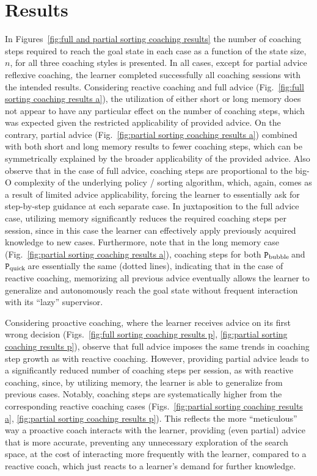 \documentclass[a4paper,twoside]{article}
\newcommand{\bubblecoach}{\ensuremath{\texttt{P}_{\rm bubble}}\,}
\newcommand{\quickcoach}{\ensuremath{\texttt{P}_{\rm quick}}\,}
\begin{document}
\section{Results}\label{subsec:sorting-results}
%
In Figures~\ref{fig:full and partial sorting coaching results} the number of coaching steps required to reach the goal state in each case as a function of the state size, $n$, for all three coaching styles is presented. In all cases, except for partial advice reflexive coaching, the learner completed successfully all coaching sessions with the intended results. Considering reactive coaching and full advice (Fig.~\ref{fig:full sorting coaching results a}), the utilization of either short or long memory does not appear to have any particular effect on the number of coaching steps, which was expected given the restricted applicability of provided advice. On the contrary, partial advice (Fig.~\ref{fig:partial sorting coaching results a}) combined with both short and long memory results to fewer coaching steps, which can be symmetrically explained by the broader applicability of the provided advice. Also observe that in the case of full advice, coaching steps are proportional to the big-O complexity of the underlying policy / sorting algorithm, which, again, comes as a result of limited advice applicability, forcing the learner to essentially ask for step-by-step guidance at each separate case. In juxtaposition to the full advice case, utilizing memory significantly reduces the required coaching steps per session, since in this case the learner can effectively apply previously acquired knowledge to new cases. Furthermore, note that in the long memory case (Fig.~\ref{fig:partial sorting coaching results a}), coaching steps for both \bubblecoach and \quickcoach are essentially the same (dotted lines), indicating that in the case of reactive coaching, memorizing all previous advice eventually allows the learner to generalize and autonomously reach the goal state without frequent interaction with its ``lazy'' supervisor.

Considering proactive coaching, where the learner receives advice on its first wrong decision (Figs.~\ref{fig:full sorting coaching results p}, \ref{fig:partial sorting coaching results p}), observe that full advice imposes the same trends in coaching step growth as with reactive coaching. However, providing partial advice leads to a significantly reduced number of coaching steps per session, as with reactive coaching, since, by utilizing memory, the learner is able to generalize from previous cases. Notably, coaching steps are systematically higher from the corresponding reactive coaching cases (Figs.~\ref{fig:partial sorting coaching results a}, \ref{fig:partial sorting coaching results p}). This reflects the more ``meticulous'' way a proactive coach interacts with the learner, providing (even partial) advice that is more accurate, preventing any unnecessary exploration of the search space, at the cost of interacting more frequently with the learner, compared to a reactive coach, which just reacts to a learner's demand for further knowledge.
\end{document}
